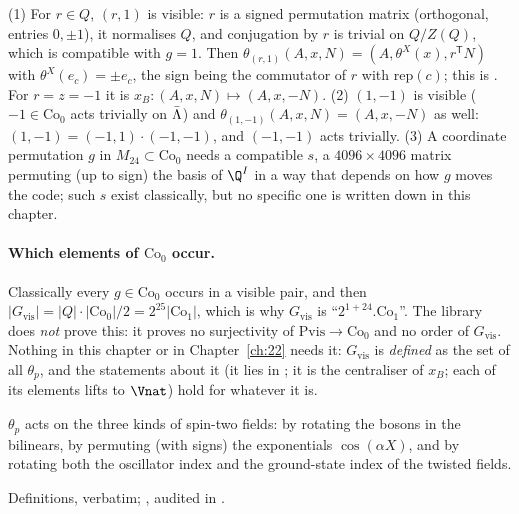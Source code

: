 \begin{example}\label{ch21:ex:visible}
(1) For $r\in Q$, $(r,1)$ is visible: $r$ is a signed permutation matrix (orthogonal, entries $0,\pm1$),
it normalises $Q$, and conjugation by $r$ is trivial on $Q/Z(Q)$, which is compatible with $g=1$.  Then
$\theta_{(r,1)}(A,x,N)=(A,\theta^X(x),r^{\mathsf T}N)$ with $\theta^X(e_c)=\pm e_c$, the sign being the
commutator of $r$ with $\mathrm{rep}(c)$; this is .  For $r=z=-1$ it is
$x_B:(A,x,N)\mapsto(A,x,-N)$.  (2) $(1,-1)$ is visible ($-1\in\mathrm{Co}_0$ acts trivially on
$\bar{\Lambda}$) and $\theta_{(1,-1)}(A,x,N)=(A,x,-N)$ as well: $(1,-1)=(-1,1)\cdot(-1,-1)$, and $(-1,-1)$ acts
trivially.  (3) A coordinate permutation $g$ in $M_{24}\subset\mathrm{Co}_0$ needs a compatible $s$, a
$4096\times4096$ matrix permuting (up to sign) the basis of $\Q^I$ in a way that depends on how $g$ moves
the code; such $s$ exist classically, but no specific one is written down in this chapter.
\end{example}

\paragraph{Which elements of $\mathrm{Co}_0$ occur.}  Classically every $g\in\mathrm{Co}_0$ occurs in a
visible pair, and then $|G_{\mathrm{vis}}|=|Q|\cdot|\mathrm{Co}_0|/2=2^{25}|\mathrm{Co}_1|$, which is why
$G_{\mathrm{vis}}$ is ``$2^{1+24}.\mathrm{Co}_1$''.  The library does \emph{not} prove this: it proves no
surjectivity of $\mathrm{Pvis}\to\mathrm{Co}_0$ and no order of $G_{\mathrm{vis}}$.  Nothing in this chapter
or in Chapter~\ref{ch:22} needs it: $G_{\mathrm{vis}}$ is \emph{defined} as the set of all $\theta_p$, and
the statements about it (it lies in ; it is the centraliser of $x_B$; each of its elements lifts
to $\Vnat$) hold for whatever it is.
\begin{physics}
$\theta_p$ acts on the three kinds of spin-two fields: by rotating the bosons in the bilinears, by
permuting (with signs) the exponentials $\cos(\alpha X)$, and by rotating both the oscillator index and
the ground-state index of the twisted fields.
\end{physics}
\begin{status}
Definitions, verbatim; ,  audited in .
\end{status}

